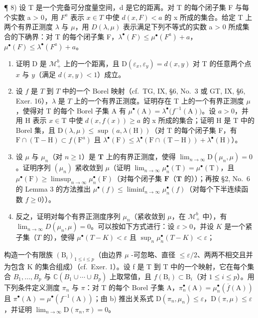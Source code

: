 ¶ 8) 设 T 是一个完备可分度量空间，d 是它的距离。对 T 的每个闭子集 F 与每个实数 a > 0，用 \(F^{a}\) 表示 \(x \in T\) 中使 \(d(x, F) < a\) 的 x 所成的集合。给定 T 上两个有界正测度 \(\lambda\) 与 \(\mu\)，用 \(D(\lambda, \mu)\) 表示满足下列不等式的实数 a > 0 所成集合的下确界：对 T 的每个闭子集 F，\(\lambda^{\bullet}(F) \leqslant \mu^{\bullet}(F^{a}) + a\)，\(\mu^{\bullet}(F) \leqslant \lambda^{\bullet}(F^{a}) + a\)。

\begin{enumerate}
\def\labelenumi{\alph{enumi})}
\item
  证明 D 是 \(\mathcal{M}_+^b\) 上的一个距离，且 \(\mathrm{D}(\varepsilon_x,\varepsilon_y) = d(x,y)\) 对 T 的任意两个点 \(x\) 与 \(y\)（满足 \(d(x,y) < 1\)）成立。
\item
  设 \(f\) 是 \(T\) 到 \(T\) 中的一个 Borel 映射（cf.~TG, IX, §6, No.~3 或 GT, IX, §6, Exer. 16），\(\lambda\) 是 \(T\) 上的一个有界正测度。证明存在 T 上的一个有界正测度 \(\mu\)，使得对 T 的每个 Borel 子集 A 有 \(\mu^{\bullet}(\mathrm{A}) = \lambda^{\bullet}\big(f^{-1}(\mathrm{A})\big)\)。设 \(a > 0\)，并用 H 表示 \(x \in \mathrm{T}\) 中使 \(d(x, f(x)) \geqslant a\) 的 x 所成的集合；证明 H 是 T 中的 Borel 集，且 \(\mathrm{D}(\lambda, \mu) \leqslant \sup (a, \lambda(\mathrm{H}))\)（对 T 的每个闭子集 F，有 \(\mathrm{F} \cap (\mathrm{T} - \mathrm{H}) \subset f(\mathrm{F}^a)\) 且 \(\lambda^{\bullet}(\mathrm{F}) \leqslant \lambda^{\bullet}(\mathrm{F} \cap (\mathrm{T} - \mathrm{H})) + \lambda^{\bullet}(\mathrm{H})\)）。
\item
  设 \(\mu\) 与 \(\mu_n\)（对 \(n \geqslant 1\)）是 \(\mathbf{T}\) 上的有界正测度，使得 \(\lim_{n \to \infty} \mathrm{D}(\mu_n, \mu) = 0\)。证明序列 \((\mu_n)\) 紧收敛到 \(\mu\)（证明 \(\lim_{n \to \infty} \mu_n^\bullet(\mathrm{T}) = \mu^\bullet(\mathrm{T})\)，且 \(\mu^\bullet(\mathrm{F}) \geqslant \limsup_{n \to \infty} \mu_n^\bullet(\mathrm{F})\)（对每个闭子集 \(\mathbf{F}\)（\(\mathbf{T}\) 的））；再按 §2, No.~6 的 Lemma 3 的方法推出 \(\mu^\bullet(f) \leqslant \liminf_{n \to \infty} \mu_n^\bullet(f)\)（对每个下半连续函数 \(f \geqslant 0\)））。
\item
  反之，证明对每个有界正测度序列 \(\mu_n\)（紧收敛到 \(\mu\)，在 \(\mathcal{M}_+^b\) 中），有 \(\lim_{n \to \infty} D(\mu_n, \mu) = 0\)。可以按如下方式进行：设 \(\varepsilon > 0\)，并设 \(K\) 是一个紧子集（\(T\) 的），使得 \(\mu^\bullet(T - K) < \varepsilon\) 且 \(\sup_{n} \mu_n^\bullet(T - K) < \varepsilon\)；
\end{enumerate}

构造一个有限族 \((\mathrm{B}_{i})_{1\leqslant i\leqslant p}\)（由边界 \(\mu\) -可忽略、直径 \(\leqslant\varepsilon/2\)、两两不相交且并为包含 K 的集合组成）（cf.~Exer. 1）。设 f 是 T 到 T 中的一个映射，它在每个集合 \(B_{1},\ldots,B_{p}\) 与 \(\mathbb{C}(B_{1}\cup\cdots\cup B_{p})\) 上取常值，且 \(f(\mathrm{B}_i) \subset \mathrm{B}_i\)（对 \(1 \leqslant i \leqslant p\)）。用下列条件定义测度 \(\pi_n\) 与 \(\pi\)：对 T 的每个 Borel 子集 A，\(\pi_n^\bullet(\mathrm{A}) = \mu_n^\bullet(\overline{f}(\mathrm{A}))\) 且 \(\pi^\bullet(\mathrm{A}) = \mu^\bullet(f^{-1}(\mathrm{A}))\)；由 b) 推出关系式 \(\mathrm{D}(\pi_n, \mu_n) \leqslant \varepsilon\)，\(\mathrm{D}(\pi, \mu) \leqslant \varepsilon\)，并证明 \(\lim_{n \to \infty} \mathrm{D}(\pi_n, \pi) = 0\)。

